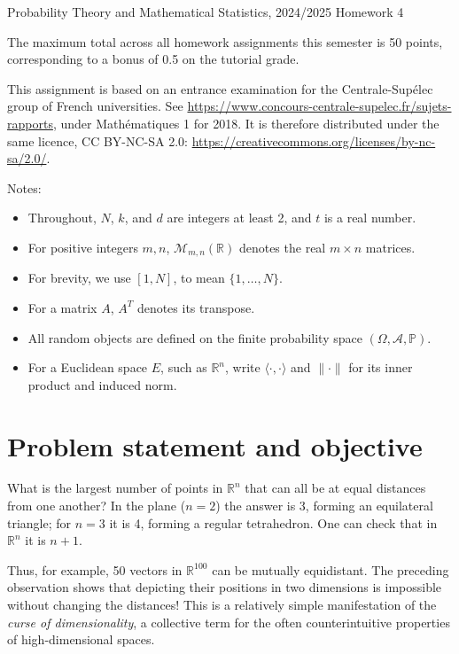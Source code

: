 \documentclass[a4paper]{report}
\begin{document}
\noindent Probability Theory and Mathematical Statistics, 2024/2025 \hfill Homework 4

\hrulefill

\begin{it}
The maximum total across all homework assignments this semester is 50 points,
corresponding to a bonus of 0.5 on the tutorial grade.


This assignment is based on an entrance examination for
the Centrale-Sup\'elec group of French universities. See
\url{https://www.concours-centrale-supelec.fr/sujets-rapports}, under Math\'ematiques
1 for 2018. It is therefore distributed under the same licence,
CC BY-NC-SA 2.0: \url{https://creativecommons.org/licenses/by-nc-sa/2.0/}.

\end{it}

Notes:
\begin{itemize}
\item Throughout, \(N\), \(k\), and \(d\) are integers at least 2,
and $t$ is a real number.
\item For positive integers \(m,n\), \(\mathcal M_{m,n}(\mathbb R)\) denotes the real \(m\times n\) matrices.
  \item 
For brevity,
we use
  $[1,N]$,
to mean
  $\{1,\dots,N\}$.
\item For a matrix \(A\), \(A^T\) denotes its transpose.
\item All random objects are defined on the finite probability space \((\Omega,\mathcal A,\mathbb P)\).
\item For a Euclidean space \(E\), such as $\mathbb R^n$, write \(\langle\cdot,\cdot\rangle\) and \(\|\cdot\|\) for its inner product and induced norm.
\end{itemize}

\section*{Problem statement and objective}

What is the largest number of points in $\mathbb R^n$
that can all be at equal distances from one another?
In the plane ($n=2$) the answer is 3, forming an equilateral triangle;
for $n=3$ it is 4, forming a regular tetrahedron. One can check that in $\mathbb R^n$ it is $n+1$.

Thus, for example, 50 vectors in $\mathbb R^{100}$ can be mutually equidistant. The preceding observation shows that depicting their positions in two dimensions is impossible
without changing the distances! This is a relatively simple manifestation of the \emph{curse of dimensionality}, a collective term for the often counterintuitive properties of high-dimensional spaces.
\end{document}
